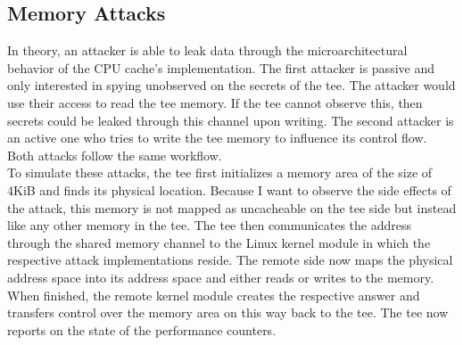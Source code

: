 \subsection{Memory Attacks}
\label{sec:implementation:attacks:memory}
In theory, an attacker is able to leak data through the microarchitectural
behavior of the CPU cache's implementation. The first attacker is passive and
only interested in spying unobserved on the secrets of the \gls{tee}. The
attacker would use their access to read the \gls{tee} memory. If the \gls{tee}
cannot observe this, then secrets could be leaked through this channel upon
writing. The second attacker is an active one who tries to write the \gls{tee}
memory to influence its control flow. Both attacks follow the same workflow.\\

To simulate these attacks, the \gls{tee} first initializes a memory area of the
size of 4KiB and finds its physical location. Because I want to observe the side
effects of the attack, this memory is not mapped as uncacheable on the \gls{tee}
side but instead like any other memory in the \gls{tee}. The \gls{tee} then
communicates the address through the shared memory channel to the Linux kernel
module in which the respective attack implementations reside. The remote side
now maps the physical address space into its address space and either reads or
writes to the memory. When finished, the remote kernel module creates the
respective answer and transfers control over the memory area on this way back to
the \gls{tee}. The \gls{tee} now reports on the state of the performance
counters.\\



